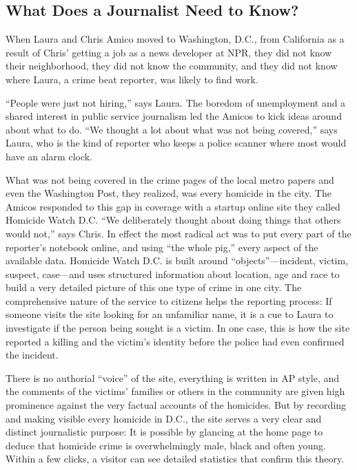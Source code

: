 \subsection{What Does a Journalist Need to Know?}
When Laura and Chris Amico moved to Washington, D.C., from California as
a result of Chris’ getting a job as a news developer at NPR, they did not know
their neighborhood, they did not know the community, and they did not know
where Laura, a crime beat reporter, was likely to find work.

``People were just not hiring,'' says Laura. The boredom of unemployment and a
shared interest in public service journalism led the Amicos to kick ideas around
about what to do. ``We thought a lot about what was not being covered,'' says
Laura, who is the kind of reporter who keeps a police scanner where most would
have an alarm clock.

What was not being covered in the crime pages of the local metro papers and
even the Washington Post, they realized, was every homicide in the city. The
Amicos responded to this gap in coverage with a startup online site they called
Homicide Watch D.C. ``We deliberately thought about doing things that others
would not,'' says Chris. In effect the most radical act was to put every part of the
reporter’s notebook online, and using ``the whole pig,'' every aspect of the available
data. Homicide Watch D.C. is built around ``objects''—incident, victim, suspect,
case—and uses structured information about location, age and race to build
a very detailed picture of this one type of crime in one city. The comprehensive
nature of the service to citizens helps the reporting process: If someone visits the
site looking for an unfamiliar name, it is a cue to Laura to investigate if the person
being sought is a victim. In one case, this is how the site reported a killing and the
victim’s identity before the police had even confirmed the incident.

There is no authorial ``voice'' of the site, everything is written in AP style, and
the comments of the victims’ families or others in the community are given high
prominence against the very factual accounts of the homicides. But by recording
and making visible every homicide in D.C., the site serves a very clear and distinct
journalistic purpose: It is possible by glancing at the home page to deduce
that homicide crime is overwhelmingly male, black and often young. Within a
few clicks, a visitor can see detailed statistics that confirm this theory.


